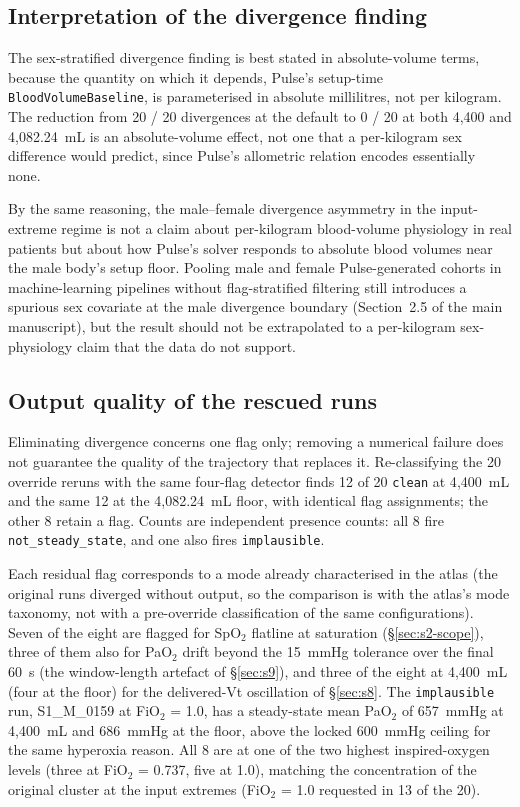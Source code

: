 \documentclass[pdflatex,sn-nature]{sn-jnl}%
\newcommand{\mainref}[2]{#2}
\begin{document}
\subsection{Interpretation of the divergence finding}\label{sec:s10-disambig}

The sex-stratified divergence finding is best stated in absolute-volume terms, because the quantity on which it depends, Pulse's setup-time \texttt{BloodVolumeBaseline}, is parameterised in absolute millilitres, not per kilogram. The reduction from 20 / 20 divergences at the default to 0 / 20 at both 4{,}400 and 4{,}082.24~mL is an absolute-volume effect, not one that a per-kilogram sex difference would predict, since Pulse's allometric relation encodes essentially none.

By the same reasoning, the male--female divergence asymmetry in the input-extreme regime is not a claim about per-kilogram blood-volume physiology in real patients but about how Pulse's solver responds to absolute blood volumes near the male body's setup floor. Pooling male and female Pulse-generated cohorts in machine-learning pipelines without flag-stratified filtering still introduces a spurious sex covariate at the male divergence boundary (Section~\mainref{sec:results-sex}{2.5} of the main manuscript), but the result should not be extrapolated to a per-kilogram sex-physiology claim that the data do not support.

\subsection{Output quality of the rescued runs}\label{sec:s10-rescued}

Eliminating divergence concerns one flag only; removing a numerical failure does not guarantee the quality of the trajectory that replaces it. Re-classifying the 20 override reruns with the same four-flag detector finds 12 of 20 \texttt{clean} at 4{,}400~mL and the same 12 at the 4{,}082.24~mL floor, with identical flag assignments; the other 8 retain a flag. Counts are independent presence counts: all 8 fire \texttt{not\_steady\_state}, and one also fires \texttt{implausible}.

Each residual flag corresponds to a mode already characterised in the atlas (the original runs diverged without output, so the comparison is with the atlas's mode taxonomy, not with a pre-override classification of the same configurations). Seven of the eight are flagged for SpO$_2$ flatline at saturation (\S\ref{sec:s2-scope}), three of them also for PaO$_2$ drift beyond the 15~mmHg tolerance over the final 60~s (the window-length artefact of \S\ref{sec:s9}), and three of the eight at 4{,}400~mL (four at the floor) for the delivered-Vt oscillation of \S\ref{sec:s8}. The \texttt{implausible} run, S1\_M\_0159 at FiO$_2$ = 1.0, has a steady-state mean PaO$_2$ of 657~mmHg at 4{,}400~mL and 686~mmHg at the floor, above the locked 600~mmHg ceiling for the same hyperoxia reason. All 8 are at one of the two highest inspired-oxygen levels (three at FiO$_2$ = 0.737, five at 1.0), matching the concentration of the original cluster at the input extremes (FiO$_2$ = 1.0 requested in 13 of the 20).
\end{document}
